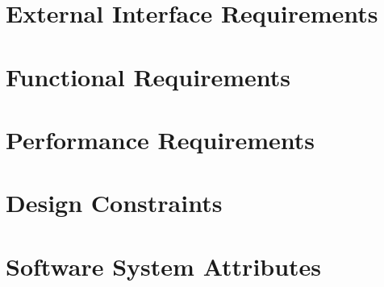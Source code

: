 \section{External Interface Requirements}

\section{Functional Requirements}

\section{Performance Requirements}

\section{Design Constraints}

\section{Software System Attributes}

